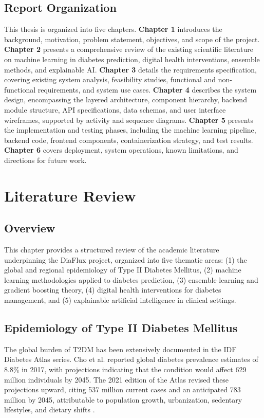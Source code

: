 \documentclass[12pt,a4paper]{report}
\begin{document}
\section{Report Organization}
This thesis is organized into five chapters. \textbf{Chapter 1} introduces the background, motivation, problem statement, objectives, and scope of the project. \textbf{Chapter 2} presents a comprehensive review of the existing scientific literature on machine learning in diabetes prediction, digital health interventions, ensemble methods, and explainable AI. \textbf{Chapter 3} details the requirements specification, covering existing system analysis, feasibility studies, functional and non-functional requirements, and system use cases. \textbf{Chapter 4} describes the system design, encompassing the layered architecture, component hierarchy, backend module structure, API specifications, data schemas, and user interface wireframes, supported by activity and sequence diagrams. \textbf{Chapter 5} presents the implementation and testing phases, including the machine learning pipeline, backend code, frontend components, containerization strategy, and test results. \textbf{Chapter 6} covers deployment, system operations, known limitations, and directions for future work.

\clearpage

\chapter{Literature Review}

\section{Overview}
This chapter provides a structured review of the academic literature underpinning the DiaFlux project, organized into five thematic areas: (1) the global and regional epidemiology of Type II Diabetes Mellitus, (2) machine learning methodologies applied to diabetes prediction, (3) ensemble learning and gradient boosting theory, (4) digital health interventions for diabetes management, and (5) explainable artificial intelligence in clinical settings.

\section{Epidemiology of Type II Diabetes Mellitus}
The global burden of T2DM has been extensively documented in the IDF Diabetes Atlas series. Cho et al. \cite{cho_idf_proj} reported global diabetes prevalence estimates of 8.8\% in 2017, with projections indicating that the condition would affect 629 million individuals by 2045. The 2021 edition of the Atlas revised these projections upward, citing 537 million current cases and an anticipated 783 million by 2045, attributable to population growth, urbanization, sedentary lifestyles, and dietary shifts \cite{idf_atlas_2021}.
\end{document}
